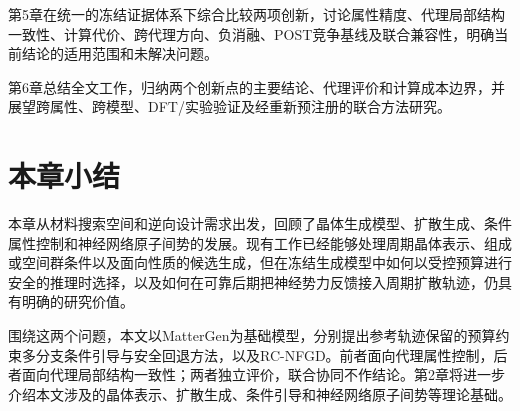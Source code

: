 第5章在统一的冻结证据体系下综合比较两项创新，讨论属性精度、代理局部结构一致性、计算代价、跨代理方向、负消融、POST竞争基线及联合兼容性，明确当前结论的适用范围和未解决问题。

第6章总结全文工作，归纳两个创新点的主要结论、代理评价和计算成本边界，并展望跨属性、跨模型、DFT/实验验证及经重新预注册的联合方法研究。

\section{本章小结}

本章从材料搜索空间和逆向设计需求出发，回顾了晶体生成模型、扩散生成、条件属性控制和神经网络原子间势的发展。现有工作已经能够处理周期晶体表示、组成或空间群条件以及面向性质的候选生成，但在冻结生成模型中如何以受控预算进行安全的推理时选择，以及如何在可靠后期把神经势力反馈接入周期扩散轨迹，仍具有明确的研究价值。

围绕这两个问题，本文以MatterGen为基础模型，分别提出参考轨迹保留的预算约束多分支条件引导与安全回退方法，以及RC-NFGD。前者面向代理属性控制，后者面向代理局部结构一致性；两者独立评价，联合协同不作结论。第2章将进一步介绍本文涉及的晶体表示、扩散生成、条件引导和神经网络原子间势等理论基础。
